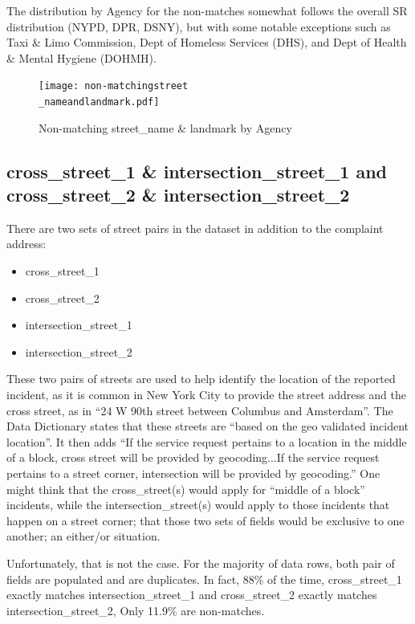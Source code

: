 \documentclass[12pt, titlepage]{article}
\begin{document}
The distribution by Agency for the non-matches somewhat follows 
the overall SR distribution (NYPD, DPR, DSNY), but with some notable 
exceptions such as Taxi \& Limo Commission, Dept of Homeless 
Services (DHS), and Dept of Health \& Mental Hygiene (DOHMH).

\begin{figure}[tbp]
	\centering
	\texttt{[image: non-matchingstreet\\\_nameandlandmark.pdf]}
	\caption{Non-matching street\_name \& landmark by Agency}
	\label{fig:landmarkchart}
\end{figure}	
	
\subsection{cross\_street\_1 \& intersection\_street\_1 and cross\_street\_2 
\& intersection\_street\_2}
\label{sec:street1}
There are two sets of street pairs in the dataset in addition to 
the complaint address:

\begin{itemize}
	\item cross\_street\_1
	\item cross\_street\_2
	\item intersection\_street\_1
	\item intersection\_street\_2
\end{itemize}
	
These two pairs of streets are used to help identify the location of the 
reported incident, as it is common in New York City to provide the 
street address and the cross street, as in ``24 W 90th street between 
Columbus and Amsterdam''. The Data Dictionary states that these 
streets are ``based on the geo validated incident location''. It then 
adds ``If the service request pertains to a location in the middle of a 
block, cross street will be provided by geocoding...If the service 
request pertains to a street corner, intersection will be provided by 
geocoding.''  One might think that the cross\_street(s) would apply 
for ``middle of a block'' incidents, while the intersection\_street(s) 
would apply to those incidents that happen on a street corner; 
that those two sets of fields would be exclusive to one another; 
an either/or situation. 

Unfortunately, that is not the case. For the majority of data rows, both 
pair of fields are populated and are duplicates. In fact, 88\% of the 
time, cross\_street\_1 exactly matches intersection\_street\_1 and 
cross\_street\_2 exactly matches intersection\_street\_2, Only 
11.9\% are non-matches.
\end{document}
